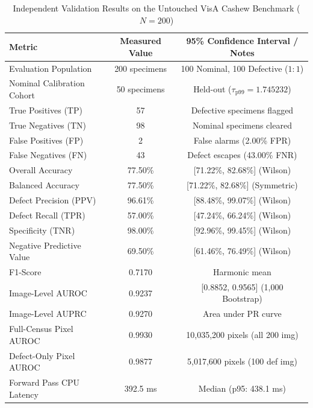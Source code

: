 \begin{table}[t]
\centering
\caption{Independent Validation Results on the Untouched VisA Cashew Benchmark ($N=200$)}
\label{tab:visa_cashew_summary}
\begin{tabular}{lcc}
\toprule
\textbf{Metric} & \textbf{Measured Value} & \textbf{95\% Confidence Interval / Notes} \\
\midrule
Evaluation Population & 200 specimens & 100 Nominal, 100 Defective ($1:1$) \\
Nominal Calibration Cohort & 50 specimens & Held-out ($\tau_{\text{p99}} = 1.745232$) \\
\midrule
True Positives (TP) & 57 & Defective specimens flagged \\
True Negatives (TN) & 98 & Nominal specimens cleared \\
False Positives (FP) & 2 & False alarms (2.00\% FPR) \\
False Negatives (FN) & 43 & Defect escapes (43.00\% FNR) \\
\midrule
Overall Accuracy & 77.50\% & [71.22\%, 82.68\%] (Wilson) \\
Balanced Accuracy & 77.50\% & [71.22\%, 82.68\%] (Symmetric) \\
Defect Precision (PPV) & 96.61\% & [88.48\%, 99.07\%] (Wilson) \\
Defect Recall (TPR) & 57.00\% & [47.24\%, 66.24\%] (Wilson) \\
Specificity (TNR) & 98.00\% & [92.96\%, 99.45\%] (Wilson) \\
Negative Predictive Value & 69.50\% & [61.46\%, 76.49\%] (Wilson) \\
F1-Score & 0.7170 & Harmonic mean \\
Image-Level AUROC & 0.9237 & [0.8852, 0.9565] (1,000 Bootstrap) \\
Image-Level AUPRC & 0.9270 & Area under PR curve \\
Full-Census Pixel AUROC & 0.9930 & 10,035,200 pixels (all 200 img) \\
Defect-Only Pixel AUROC & 0.9877 & 5,017,600 pixels (100 def img) \\
Forward Pass CPU Latency & 392.5 ms & Median (p95: 438.1 ms) \\
\bottomrule
\end{tabular}
\end{table}
